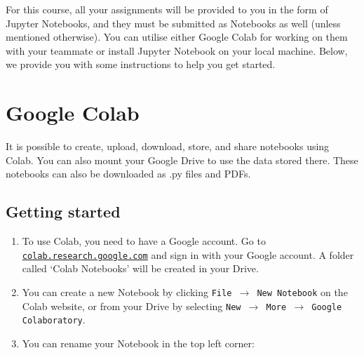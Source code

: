 \documentclass[a4paper,10pt]{article}
\begin{document}


\vspace{1cm}


For this course, all your assignments will be provided to you in the form of Jupyter Notebooks, and they must be submitted as Notebooks as well (unless mentioned otherwise). You can utilise either Google Colab for working on them with your teammate or install Jupyter Notebook on your local machine. Below, we provide you with some instructions to help you get started.

\section{Google Colab}
It is possible to create, upload, download, store, and share notebooks using Colab. You can also mount your Google Drive to use the data stored there. These notebooks can also be downloaded as .py files and PDFs.

\subsection{Getting started}
\begin{enumerate}
    \item To use Colab, you need to have a Google account. Go to \href{https://colab.research.google.com}{\nolinkurl{colab.research.google.com}} and sign in with your Google account. A folder called `Colab Notebooks' will be created in your Drive. 
    \item You can create a new Notebook by clicking \texttt{File $\rightarrow$ New Notebook} on the Colab website, or from your Drive by selecting \texttt{New $\rightarrow$ More $\rightarrow$ Google Colaboratory}.
    
    \item You can rename your Notebook in the top left corner:
    
    \begin{center}
    \end{center}
\end{enumerate}
\end{document}
